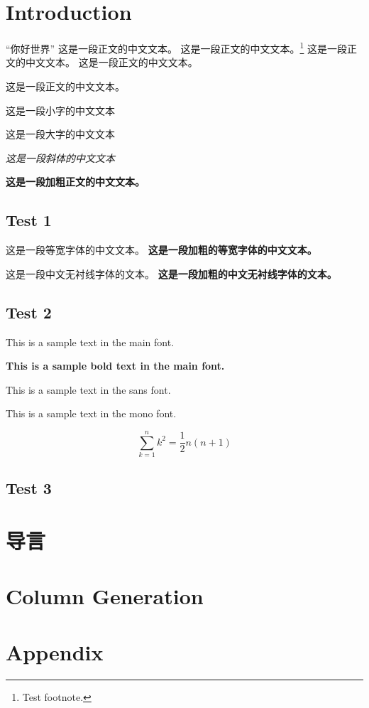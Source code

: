 \documentclass[10pt, a4paper, fontset=none, no-math]{ctexbook}
\begin{document}
\chapter{Introduction}
``你好世界''
这是一段正文的中文文本。
这是一段正文的中文文本。\footnote{Test footnote.}
这是一段正文的中文文本。
这是一段正文的中文文本。

这是一段正文的中文文本。

{\small 这是一段小字的中文文本}

{\Large 这是一段大字的中文文本}

{\itshape 这是一段斜体的中文文本}

\textbf{这是一段加粗正文的中文文本。}

\section{Test 1}

{
这是一段等宽字体的中文文本。
\textbf{这是一段加粗的等宽字体的中文文本。}
}

{
这是一段中文无衬线字体的文本。
\textbf{这是一段加粗的中文无衬线字体的文本。}
}

\section{Test 2}

This is a sample text in the main font. 

\textbf{This is a sample bold text in the main font.}

{\sffamily This is a sample text in the sans font.}

{\ttfamily This is a sample text in the mono font.}

\begin{equation}
    \sum_{k=1}^n k^2 = \frac{1}{2} n (n+1)
\end{equation}

\section{Test 3}

\lipsum[30-50]


\chapter{导言}

\lipsum[10-20]

\chapter{Column Generation}

\lipsum[10-20]

\chapter*{Appendix}

\lipsum[10-20]


% 
\end{document}
